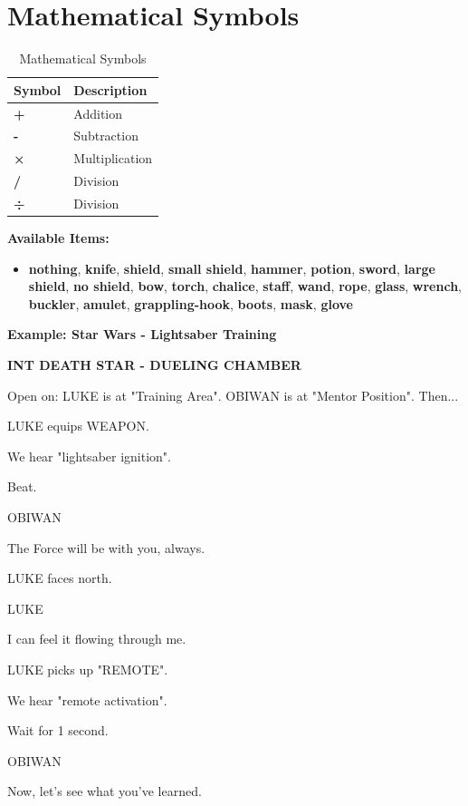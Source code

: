 \documentclass[11pt,letterpaper,oldstylefigures]{memoir}
\newcommand{\slugline}[1]{\nobreak\textbf{\MakeUppercase{#1}}\par\nobreak\vspace{1\baselineskip}}
\newcommand{\speaker}[1]{\nobreak\hspace*{0.333\textwidth}\MakeUppercase{#1}\par\nobreak\vspace{0.5\baselineskip}}
\newcommand{\dialogue}[1]{\nobreak\hspace*{0.25\textwidth}\begin{minipage}{0.5\textwidth}#1\end{minipage}\par\vspace{1\baselineskip}}
\newcommand{\stagedir}[1]{#1\par\vspace{1\baselineskip}}
\newenvironment{FountainExample}
  {\begingroup
  \ttfamily\small
   \setlength{\parindent}{0pt}
  \setlength{\parskip}{0.5em}
  \allowdisplaybreaks
  \setlength{\displaywidowpenalty}{0}
  \setlength{\widowpenalty}{0}
  \setlength{\clubpenalty}{0}
  \setlength{\interlinepenalty}{0}
}
  {\endgroup}
\newcommand{\fountain}[1]{\textbf{#1}}
\begin{document}
\section{Mathematical Symbols}
\begin{table}[h]
\centering
\begin{tabular}{|l|l|}
\hline
\textbf{Symbol} & \textbf{Description} \\
\hline
\fountain{+} & Addition \\
\fountain{-} & Subtraction \\
\fountain{×} & Multiplication \\
\fountain{/} & Division \\
\fountain{÷} & Division \\
\hline
\end{tabular}
\caption{Mathematical Symbols}
\end{table}

\textbf{Available Items:}
\begin{itemize}
\item \fountain{nothing}, \fountain{knife}, \fountain{shield}, \fountain{small shield}, \fountain{hammer}, \fountain{potion}, \fountain{sword}, \fountain{large shield}, \fountain{no shield}, \fountain{bow}, \fountain{torch}, \fountain{chalice}, \fountain{staff}, \fountain{wand}, \fountain{rope}, \fountain{glass}, \fountain{wrench}, \fountain{buckler}, \fountain{amulet}, \fountain{grappling-hook}, \fountain{boots}, \fountain{mask}, \fountain{glove}
\end{itemize}

\textbf{Example: Star Wars - Lightsaber Training}

\begin{FountainExample}
\slugline{INT DEATH STAR - DUELING CHAMBER}

\stagedir{Open on: LUKE is at "Training Area". OBIWAN is at "Mentor Position". Then...}

\stagedir{LUKE equips WEAPON.}
\stagedir{We hear "lightsaber ignition".}
\stagedir{Beat.}
\speaker{OBIWAN}
\dialogue{The Force will be with you, always.}

\stagedir{LUKE faces north.}

\speaker{LUKE}
\dialogue{I can feel it flowing through me.}

\stagedir{LUKE picks up "REMOTE".}
\stagedir{We hear "remote activation".}
\stagedir{Wait for 1 second.}

\speaker{OBIWAN}
\dialogue{Now, let's see what you've learned.}
\end{FountainExample}
\end{document}
